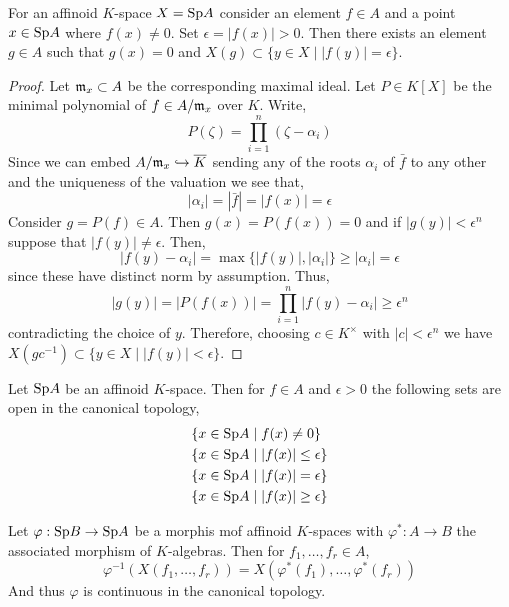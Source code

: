\documentclass[12pt]{article}
\begin{document}
\begin{lemma}
For an affinoid $K$-space $X = \mathrm{Sp}{A}$ consider an element $f \in A$ and a point $x \in \mathrm{Sp}{A}$ where $f(x) \neq 0$. Set $\epsilon = |f(x)| > 0$. Then there exists an element $g \in A$ such that $g(x) = 0$ and $X(g) \subset \{ y \in X \mid |f(y)| = \epsilon\}$.
\end{lemma}

\begin{proof}
Let $\mathfrak{m}_x \subset A$ be the corresponding maximal ideal. Let $P \in K[X]$ be the minimal polynomial of $f \in A / \mathfrak{m}_x$ over $K$. Write,
\[ P(\zeta) = \prod_{i = 1}^n (\zeta - \alpha_i) \]
Since we can embed $A / \mathfrak{m}_x \hookrightarrow \overline{K}$ sending any of the roots $\alpha_i$ of $\bar{f}$ to any other and the uniqueness of the valuation we see that,
\[ | \alpha_i | = | \bar{f} | = |f(x)| = \epsilon \]
Consider $g = P(f) \in A$. Then $g(x) = P(f(x)) = 0$ and if $|g(y)| < \epsilon^n$ suppose that $|f(y)| \neq \epsilon$. Then,
\[ |f(y) - \alpha_i | = \max \{ |f(y)| , |\alpha_i| \} \ge |\alpha_i| = \epsilon \]
since these have distinct norm by assumption. Thus,
\[ |g(y)| = |P(f(x))| = \prod_{i=1}^n |f(y) - \alpha_i| \ge \epsilon^n \]
contradicting the choice of $y$. Therefore, choosing $c \in K^\times$ with $|c| < \epsilon^n$ we have $X(g c^{-1}) \subset \{ y \in X \mid |f(y)| < \epsilon \}$.
\end{proof}

\begin{cor}
Let $\mathrm{Sp}{A}$ be an affinoid $K$-space. Then for $f \in A$ and $\epsilon > 0$ the following sets are open in the canonical topology,
\begin{align*}
& \{ x \in \mathrm{Sp}{A} \mid f(x) \neq 0 \}
\\
& \{ x \in \mathrm{Sp}{A} \mid |f(x)| \le \epsilon \}
\\
& \{ x \in \mathrm{Sp}{A} \mid |f(x)| = \epsilon \}
\\
& \{ x \in \mathrm{Sp}{A} \mid |f(x)| \ge \epsilon \}
\end{align*}
\end{cor}

\begin{prop}
Let $\varphi : \mathrm{Sp}{B} \to \mathrm{Sp}{A}$ be a morphis mof affinoid $K$-spaces with $\varphi^* : A \to B$ the associated morphism of $K$-algebras. Then for $f_1, \dots, f_r \in A$,
\[ \varphi^{-1}(X(f_1, \dots, f_r)) = X(\varphi^*(f_1), \dots, \varphi^*(f_r)) \]
And thus $\varphi$ is continuous in the canonical topology.
\end{prop}
\end{document}
